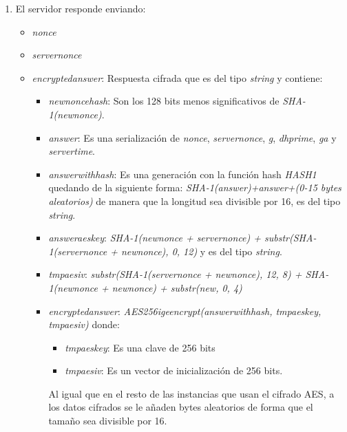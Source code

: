 \begin{enumerate}
	\item El servidor responde enviando:
		\begin{itemize}
			\item \emph{nonce}
			\item \emph{server\textunderscore nonce}
			\item \emph{encrypted\textunderscore answer}: Respuesta cifrada que es del tipo \emph{string} y contiene:
			\begin{itemize}
				\item \emph{new\textunderscore nonce\textunderscore hash}: Son los 128 bits menos significativos de \emph{SHA-1(new\textunderscore nonce)}.
				\item \emph{answer}: Es una serialización de \emph{nonce}, \emph{server\textunderscore nonce}, \emph{g}, \emph{dh\textunderscore prime}, \emph{g\textunderscore a} y \emph{server\textunderscore time}.
				\item \emph{answer\textunderscore with\textunderscore hash}: Es una generación con la función hash \emph{HASH1} quedando de la siguiente forma: \emph{SHA-1(answer)+answer+(0-15 bytes aleatorios)} de manera que la longitud sea divisible por 16, es del tipo \emph{string}.
				\item \emph{answer\textunderscore aes\textunderscore key}: \emph{SHA-1(new\textunderscore nonce + server\textunderscore nonce) + substr(SHA-1(server\textunderscore nonce + new\textunderscore nonce), 0, 12)} y es del tipo \emph{string}.
				\item \emph{tmp\textunderscore aes\textunderscore iv}: \emph{substr(SHA-1(server\textunderscore nonce + new\textunderscore nonce), 12, 8) + SHA-1(new\textunderscore nonce + new\textunderscore nonce) + substr(new\textunderscore, 0, 4)}
				\item \emph{encrypted\textunderscore answer}: \emph{AES256\textunderscore ige\textunderscore encrypt(answer\textunderscore with\textunderscore hash, tmp\textunderscore aes\textunderscore key, tmp\textunderscore aes\textunderscore iv)} donde:
				\begin{itemize}
					\item \emph{tmp\textunderscore aes\textunderscore key}: Es una clave de 256 bits
					\item \emph{tmp\textunderscore aes\textunderscore iv}: Es un vector de inicialización de 256 bits.
				\end{itemize}
				Al igual que en el resto de las instancias que usan el cifrado AES, a los datos cifrados se le añaden bytes aleatorios de forma que el tamaño sea divisible por 16.

\end{itemize}
\end{itemize}
\end{enumerate}
